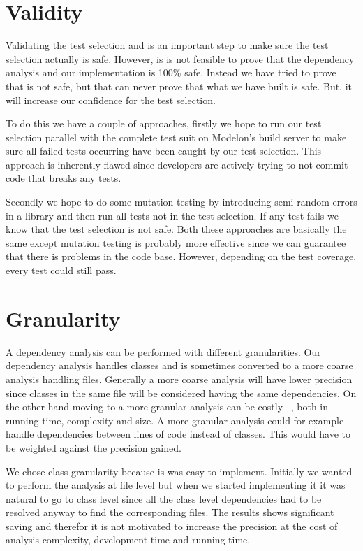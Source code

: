 \documentclass{cslthse-msc}
\begin{document}
\section{Validity}
Validating the test selection and is an important step to make sure the test selection actually is safe. 
However, is is not feasible to prove that the dependency analysis and our implementation is 100\% safe. Instead we have tried to prove that is not safe, but that can never prove that what we have built is safe. But, it will increase our confidence for the test selection. 

To do this we have a couple of approaches, firstly we hope to run our test selection parallel with the complete test suit on Modelon's build server to make sure all failed tests occurring have been caught by our test selection. This approach is inherently flawed since developers are actively trying to not commit code that breaks any tests. %


Secondly we hope to do some mutation testing by introducing semi random errors in a library and then run all tests not in the test selection. If any test fails we know that the test selection is not safe. Both these approaches are basically the same except mutation testing is probably more effective since we can guarantee that there is problems in the code base. However, depending on the test coverage, every test could still pass.


\section{Granularity}
A dependency analysis can be performed with different granularities. Our dependency analysis handles classes and is sometimes converted to a more coarse analysis handling files. Generally a more coarse analysis will have lower precision since classes in the same file will be considered having the same dependencies. On the other hand moving to a more granular analysis can be costly ~\cite{DBLP:conf/sigsoft/LegunsenHSLZM16}, both in running time, complexity and size. A more granular analysis could for example handle dependencies between lines of code instead of classes. This would have to be weighted against the precision gained.

We chose class granularity because is was easy to implement. Initially we wanted to perform the analysis at file level but when we started implementing it it was natural to go to class level since all the class level dependencies had to be resolved anyway to find the corresponding files. The results shows significant saving and therefor it is not motivated to increase the precision at the cost of analysis complexity, development time and running time.
\end{document}
